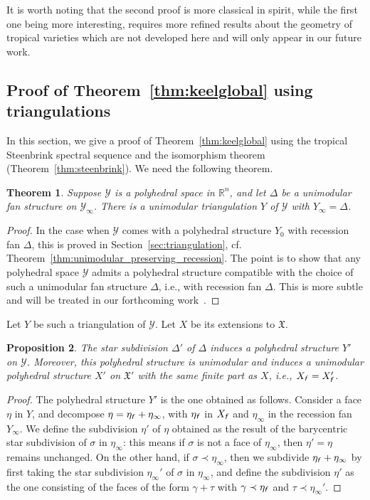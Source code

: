 \documentclass[11pt]{amsart}
\newtheorem{thm}{Theorem}[section]
\newtheorem{prop}[thm]{Proposition}
\theoremstyle{definition}
\numberwithin{equation}{section}
\newcommand{\cf}[1]{cf.}
\newcommand{\ie}{i.e.}
\renewcommand{\~}{\widetilde}
\newcommand{\R}{\mathbb{R}}
\newcommand{\f}{{\textnormal{\textsl{\textsf f}}}} %
\newcommand{\X}{\mathfrak X}
\newcommand{\Y}{\mathscr Y}
\newcommand{\subface}{\prec}
\begin{document}
It is worth noting  that the second proof is more classical in spirit, while the first one being more interesting, requires more refined results about the geometry of tropical varieties which are not developed here and will only appear in our future work.



\subsection{Proof of Theorem~\ref{thm:keelglobal} using triangulations}

In this section, we give a proof of Theorem~\ref{thm:keelglobal} using the tropical Steenbrink spectral sequence and the isomorphism theorem (Theorem~\ref{thm:steenbrink}). We need the following theorem.

\begin{thm} Suppose $\Y$ is a polyhedral space in $\R^n$, and let $\Delta$ be a unimodular fan structure on $\mathscr Y_\infty$. There is a unimodular triangulation $Y$ of $\Y$ with $Y_\infty=\Delta$.
\end{thm}
\begin{proof} In the case when $\Y$ comes with a polyhedral structure $Y_0$ with recession fan $\Delta$, this is proved in Section~\ref{sec:triangulation}, \cf. Theorem~\ref{thm:unimodular_preserving_recession}. The point is to show that any polyhedral space $\Y$ admits a polyhedral structure compatible with the choice of such a unimodular fan structure $\Delta$, \ie, with recession fan $\Delta$. This is more subtle and will be treated in our forthcoming work~\cite{AP-geom}.
\end{proof}

Let $Y$ be such a triangulation of $\Y$. Let $X$ be its extensions to $\X$.

\begin{prop} The star subdivision $\Delta'$ of $\Delta$ induces a polyhedral structure $Y'$ on $\Y$.
Moreover, this polyhedral structure is unimodular and induces a unimodular polyhedral structure $X'$ on $\X'$ with the same finite part as $X$, \ie, $X_\f = X'_\f$.
\end{prop}
\begin{proof} The polyhedral structure $Y'$ is the one obtained as follows. Consider a face $\eta$ in $Y$, and decompose $\eta =\eta_\f+ \eta_\infty$, with $\eta_\f$ in $X_\f$ and $\eta_\infty$ in the recession fan $Y_\infty$. We define the subdivision $\eta'$ of $\eta$ obtained as the result of the barycentric star subdivision of $\sigma$ in $\eta_\infty$: this means if $\sigma$ is not a face of $\eta_\infty$, then $\eta'=\eta$ remains unchanged. On the other hand, if $\sigma \subface \eta_\infty$, then we subdivide $\eta_\f+ \eta_\infty$ by first taking the star subdivision $\eta_\infty'$ of $\sigma$ in $\eta_\infty$, and define the subdivision $\eta'$ as the one consisting of the faces of the form $\gamma + \tau$ with $\gamma \subface \eta_\f$ and $\tau \subface \eta_\infty'$.
\end{proof}
\end{document}
